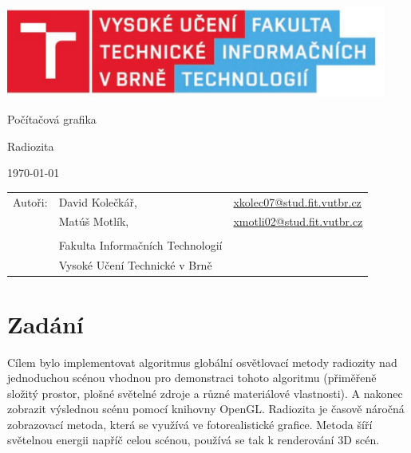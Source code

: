 \documentclass[12pt,a4paper,titlepage,final]{report}
\makeatletter
\newcommand\Course{Počítačová grafika}
\newcommand\WorkTitle{Radiozita}
\newcommand\AuthorA{David Kolečkář}
\newcommand\AuthorAEmail{xkolec07@stud.fit.vutbr.cz}
\newcommand\AuthorB{Matúš Motlík}
\newcommand\AuthorBEmail{xmotli02@stud.fit.vutbr.cz}
\newcommand\Faculty{Fakulta Informačních Technologií}
\newcommand\School{Vysoké Učení Technické v Brně}
\makeatother
\begin{document}
	\begin{titlepage}
	\begin{center}
		\includegraphics[height=3cm]{images/logo.pdf}
	\end{center}
	\vfill
	\begin{center}
		\begin{Large}
			\Course\\
		\end{Large}
		\bigskip
		\begin{Huge}
			\WorkTitle\\
		\end{Huge}
	\end{center}
	\vfill
	\begin{center}
		\begin{large}
			\today
		\end{large}
	\end{center}
	\vfill
	\begin{flushleft}
		\begin{large}
			\begin{tabular}{lll}
				Autoři: & \AuthorA, & \url{\AuthorAEmail} \\
				        & \AuthorB, & \url{\AuthorBEmail} \\
				& & \\
				& \Faculty \\
				& \School \\
			\end{tabular}
		\end{large}
	\end{flushleft}
\end{titlepage}		
	
	
\tableofcontents

\newpage
\chapter{Zadání}

Cílem bylo implementovat algoritmus globální osvětlovací metody radiozity nad jednoduchou scénou vhodnou pro demonstraci tohoto algoritmu (přiměřeně složitý prostor, plošné světelné zdroje a různé materiálové vlastnosti). A nakonec zobrazit výslednou scénu pomocí knihovny OpenGL.
Radiozita je časově náročná zobrazovací metoda, která se využívá ve fotorealistické grafice. Metoda šíří světelnou energii napříč celou scénou, používá se tak k renderování 3D scén. 
\end{document}

